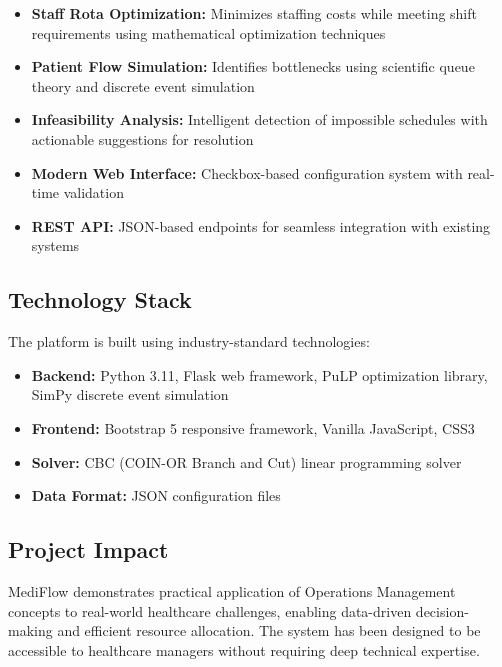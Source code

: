 \documentclass[12pt,a4paper]{article}
\begin{document}
\begin{itemize}
    \item \textbf{Staff Rota Optimization:} Minimizes staffing costs while meeting shift requirements using mathematical optimization techniques
    \item \textbf{Patient Flow Simulation:} Identifies bottlenecks using scientific queue theory and discrete event simulation
    \item \textbf{Infeasibility Analysis:} Intelligent detection of impossible schedules with actionable suggestions for resolution
    \item \textbf{Modern Web Interface:} Checkbox-based configuration system with real-time validation
    \item \textbf{REST API:} JSON-based endpoints for seamless integration with existing systems
\end{itemize}

\subsection{Technology Stack}

The platform is built using industry-standard technologies:
\begin{itemize}
    \item \textbf{Backend:} Python 3.11, Flask web framework, PuLP optimization library, SimPy discrete event simulation
    \item \textbf{Frontend:} Bootstrap 5 responsive framework, Vanilla JavaScript, CSS3
    \item \textbf{Solver:} CBC (COIN-OR Branch and Cut) linear programming solver
    \item \textbf{Data Format:} JSON configuration files
\end{itemize}

\subsection{Project Impact}

MediFlow demonstrates practical application of Operations Management concepts to real-world healthcare challenges, enabling data-driven decision-making and efficient resource allocation. The system has been designed to be accessible to healthcare managers without requiring deep technical expertise.

\newpage

\end{document}
